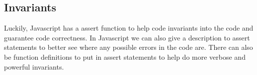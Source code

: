 \documentclass{article}
\begin{document}
\subsection{Invariants}
Luckily, Javascript has a assert function to help code invariants into the 
code and guarantee code correctness. In Javascript we can also give a 
description to assert statements to better see where any possible errors in
the code are. There can also be function definitions to put in assert statements
to help do more verbose and powerful invariants.
\end{document}
